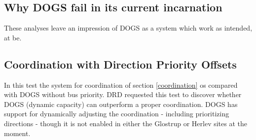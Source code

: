 \subsection*{Why DOGS fail in its current incarnation}
These analyses leave an impression of DOGS as a system which work as intended, at be.

\subsection{Coordination with Direction Priority Offsets}
In this test the system for coordination of section \ref{coordination} os compared with DOGS without bus priority. DRD requested this test to discover whether DOGS (dynamic capacity) can outperform a proper coordination. DOGS has support for dynamically adjusting the coordination - including prioritizing directions - though it is not enabled in either the Glostrup or Herlev sites at the moment.

